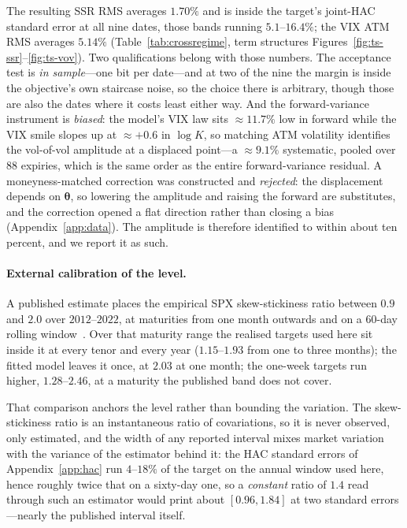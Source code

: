 \documentclass[11pt]{article}
\providecommand{\1}{\mathbf 1}
\newcommand{\bth}{{\boldsymbol{\theta}}}
\begin{document}
The resulting SSR RMS averages $1.70\%$ and is inside the target's joint-HAC standard error at all
nine dates, those bands running $5.1$--$16.4\%$; the VIX ATM RMS averages $5.14\%$
(Table~\ref{tab:crossregime}, term structures Figures~\ref{fig:ts-ssr}--\ref{fig:ts-vov}). Two
qualifications belong with those numbers. The acceptance test is \emph{in sample}---one bit per
date---and at two of the nine the margin is inside the objective's own staircase noise, so the choice
there is arbitrary, though those are also the dates where it costs least either way. And the
forward-variance instrument is \emph{biased}: the model's VIX law sits ${\approx}11.7\%$ low in
forward while the VIX smile slopes up at ${\approx}{+}0.6$ in $\log K$, so matching ATM volatility
identifies the vol-of-vol amplitude at a displaced point---a ${\approx}9.1\%$ systematic, pooled over
$88$ expiries, which is the same order as the entire forward-variance residual. A moneyness-matched
correction was constructed and \emph{rejected}: the displacement depends on $\bth$, so lowering the
amplitude and raising the forward are substitutes, and the correction opened a flat direction rather
than closing a bias (Appendix~\ref{app:data}). The amplitude is therefore identified to within about
ten percent, and we report it as such.

\paragraph{External calibration of the level.} A published estimate places the empirical SPX
skew-stickiness ratio between $0.9$ and $2.0$ over $2012$--$2022$, at maturities from one month
outwards and on a $60$-day rolling window~\cite{abijaber2025}. Over that maturity range the realised
targets used here sit inside it at every tenor and every year ($1.15$--$1.93$ from one to three
months); the fitted model leaves it once, at $2.03$ at one month; the one-week targets run higher,
$1.28$--$2.46$, at a maturity the published band does not cover.

That comparison anchors the level rather than bounding the variation. The skew-stickiness ratio is
an instantaneous ratio of covariations, so it is never observed, only estimated, and the width of any
reported interval mixes market variation with the variance of the estimator behind it: the HAC
standard errors of Appendix~\ref{app:hac} run $4$--$18\%$ of the target on the annual window used
here, hence roughly twice that on a sixty-day one, so a \emph{constant} ratio of $1.4$ read through
such an estimator would print about $[0.96,1.84]$ at two standard errors---nearly the published
interval itself.
\end{document}
